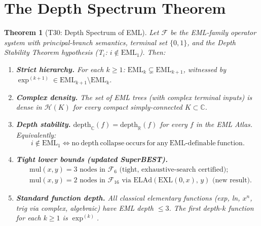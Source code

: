 \documentclass[11pt]{article}
\newtheorem{theorem}{Theorem}
\begin{document}
\section{The Depth Spectrum Theorem}

\begin{theorem}[T30: Depth Spectrum of EML]\label{thm:spectrum}
Let $\mathcal{F}$ be the EML-family operator system with principal-branch
semantics, terminal set $\{0, 1\}$, and the Depth Stability Theorem hypothesis
(T$_i$: $i \notin \mathrm{EML}_1$).  Then:

\begin{enumerate}
\item[\textbf{(a)}] \textbf{Strict hierarchy.}  For each $k \geq 1$:
      $\mathrm{EML}_k \subsetneq \mathrm{EML}_{k+1}$,
      witnessed by $\exp^{(k+1)} \in \mathrm{EML}_{k+1} \setminus \mathrm{EML}_k$.

\item[\textbf{(b)}] \textbf{Complex density.}  The set of EML trees (with
      complex terminal inputs) is dense in $\mathcal{H}(K)$ for every compact
      simply-connected $K \subset \mathbb{C}$.

\item[\textbf{(c)}] \textbf{Depth stability.}  $\mathrm{depth}_\mathbb{C}(f) =
      \mathrm{depth}_\mathbb{R}(f)$ for every $f$ in the EML Atlas.  Equivalently:
      \[
        i \notin \mathrm{EML}_1 \iff \mathrm{no\ depth\ collapse\ occurs\ for\ any\ EML\text{-}definable\ function.}
      \]

\item[\textbf{(d)}] \textbf{Tight lower bounds (updated SuperBEST).}
      \begin{align*}
        &\text{mul}(x,y) = 3 \text{ nodes in } \mathcal{F}_6
          \text{ (tight, exhaustive-search certified)};\\
        &\text{mul}(x,y) = 2 \text{ nodes in } \mathcal{F}_{16}
          \text{ via }\mathrm{ELAd}(\mathrm{EXL}(0,x),\,y)
          \text{ (new result)}.
      \end{align*}

\item[\textbf{(e)}] \textbf{Standard function depth.}
      All classical elementary functions (exp, ln, $x^n$, trig via complex,
      algebraic) have EML depth $\leq 3$.  The first depth-$k$ function for
      each $k \geq 1$ is $\exp^{(k)}$.
\end{enumerate}
\end{theorem}
\end{document}
